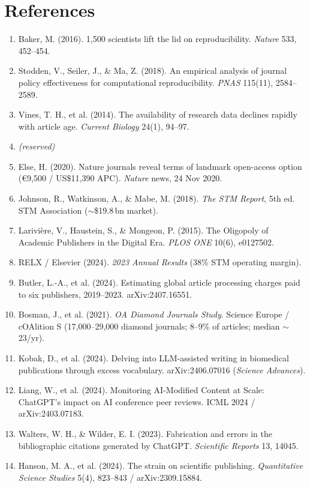 \documentclass[11pt]{article}
\begin{document}
\section*{References}
{\footnotesize\color{ink2}\raggedright
\begin{enumerate}[leftmargin=1.6em, itemsep=1.5pt]
\item Baker, M. (2016). 1{,}500 scientists lift the lid on reproducibility. \emph{Nature} 533, 452--454.
\item Stodden, V., Seiler, J., \& Ma, Z. (2018). An empirical analysis of journal policy effectiveness for computational reproducibility. \emph{PNAS} 115(11), 2584--2589.
\item Vines, T. H., et al. (2014). The availability of research data declines rapidly with article age. \emph{Current Biology} 24(1), 94--97.
\item \emph{(reserved)}
\item Else, H. (2020). Nature journals reveal terms of landmark open-access option (\euro9{,}500 / US\$11{,}390 APC). \emph{Nature} news, 24 Nov 2020.
\item Johnson, R., Watkinson, A., \& Mabe, M. (2018). \emph{The STM Report}, 5th ed. STM Association ($\sim$\$19.8\,bn market).
\item Larivière, V., Haustein, S., \& Mongeon, P. (2015). The Oligopoly of Academic Publishers in the Digital Era. \emph{PLOS ONE} 10(6), e0127502.
\item RELX / Elsevier (2024). \emph{2023 Annual Results} (38\% STM operating margin).
\item Butler, L.-A., et al. (2024). Estimating global article processing charges paid to six publishers, 2019--2023. arXiv:2407.16551.
\item Bosman, J., et al. (2021). \emph{OA Diamond Journals Study}. Science Europe / cOAlition S (17{,}000--29{,}000 diamond journals; 8--9\% of articles; median $\sim$23/yr).
\item Kobak, D., et al. (2024). Delving into LLM-assisted writing in biomedical publications through excess vocabulary. arXiv:2406.07016 (\emph{Science Advances}).
\item Liang, W., et al. (2024). Monitoring AI-Modified Content at Scale: ChatGPT's impact on AI conference peer reviews. ICML 2024 / arXiv:2403.07183.
\item Walters, W. H., \& Wilder, E. I. (2023). Fabrication and errors in the bibliographic citations generated by ChatGPT. \emph{Scientific Reports} 13, 14045.
\item Hanson, M. A., et al. (2024). The strain on scientific publishing. \emph{Quantitative Science Studies} 5(4), 823--843 / arXiv:2309.15884.

\end{enumerate}}
\end{document}
